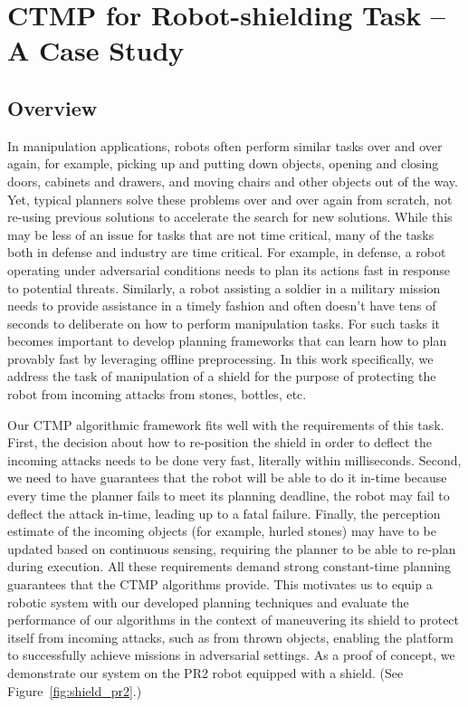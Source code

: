 \documentclass[a4paper]{report}
\begin{document}
\newpage

\chapter{CTMP for Robot-shielding Task -- A Case Study}
\label{chap:shielding}
\section{Overview}
In manipulation applications, robots often perform similar tasks over and over again, for example, picking up and putting down objects, opening and closing doors, cabinets and drawers, and moving chairs and other objects out of the way. Yet, typical planners solve these problems over and over again from scratch, not re-using previous solutions to accelerate the search for new solutions. While this may be less of an issue for tasks that are not time critical, many of the tasks both in defense and industry are time critical. For example, in defense, a robot operating under adversarial conditions needs to plan its actions fast in response to potential threats. Similarly, a robot assisting a soldier in a military mission needs to provide assistance in a timely fashion and often doesn’t have tens of seconds to deliberate on how to perform manipulation tasks. For such tasks it becomes important to develop planning frameworks that can learn how to plan provably fast by leveraging offline preprocessing. In this work specifically, we address the task of manipulation of a shield for the purpose of protecting the robot from incoming attacks from stones, bottles, etc.

Our CTMP algorithmic framework fits well with the requirements of this task. First, the decision about how to re-position the shield in order to deflect the incoming attacks needs to be done very fast, literally within milliseconds. Second, we need to have guarantees that the robot will be able to do it in-time because every time the planner fails to meet its planning deadline, the robot may fail to deflect the attack in-time, leading up to a fatal failure. Finally, the perception estimate of the incoming objects (for example, hurled stones) may have to be updated based on continuous sensing, requiring the planner to be able to re-plan during execution. All these requirements demand strong constant-time planning guarantees that the CTMP algorithms provide. This motivates us to equip a robotic system with our developed planning techniques and evaluate the performance of our algorithms in the context of maneuvering its shield to protect itself from incoming attacks, such as from thrown objects, enabling the platform to successfully achieve missions in adversarial settings.
As a proof of concept, we demonstrate our system on the PR2 robot equipped with a shield. (See Figure~\ref{fig:shield_pr2}.)
\end{document}
